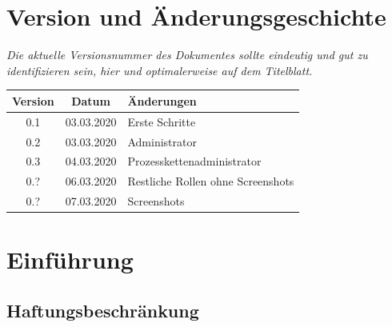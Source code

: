 \documentclass[enabledeprecatedfontcommands,fontsize=12pt,paper=a4,twoside]{scrartcl}
\begin{document}


\newpage

  \thispagestyle{fancy}
  \fancyhead{}
  \fancyfoot{}
  \renewcommand{\headrulewidth}{0.4pt}
  \tableofcontents

\newpage





\section*{Version und Änderungsgeschichte}

{\em Die aktuelle Versionsnummer des Dokumentes sollte eindeutig und gut zu
identifizieren sein, hier und optimalerweise auf dem Titelblatt.}

\begin{tabular}{ccl}
Version & Datum & Änderungen \\
\hline
0.1 & 03.03.2020 & Erste Schritte \\
0.2 & 03.03.2020 & Administrator \\
0.3 & 04.03.2020 & Prozesskettenadministrator \\
0.? & 06.03.2020 & Restliche Rollen ohne Screenshots \\
0.? & 07.03.2020 & Screenshots \\
\end{tabular}



\newpage
\section{Einführung}
\subsection{Haftungsbeschränkung}
\end{document}
